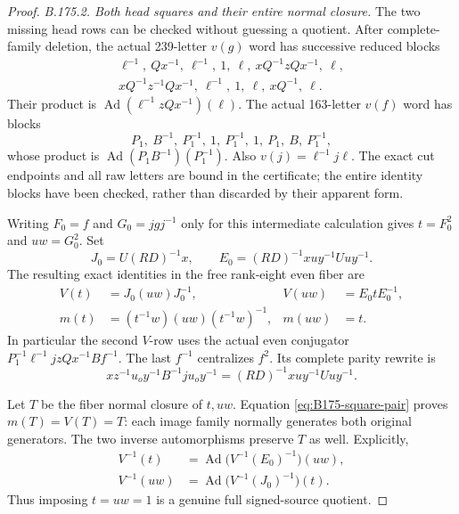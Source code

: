 \begin{proof}
\emph{B.175.2. Both head squares and their entire normal closure.}
The two missing head rows can be checked without guessing a quotient.
After complete-family deletion, the actual 239-letter \(v(g)\) word
has successive reduced blocks
\[
\begin{gathered}
 \ell^{-1},\ Qx^{-1},\ \ell^{-1},\ 1,\ \ell,
 \ xQ^{-1}zQx^{-1},\ \ell,\\
 xQ^{-1}z^{-1}Qx^{-1},\ \ell^{-1},\ 1,\ \ell,
 \ xQ^{-1},\ \ell.
\end{gathered}
\]
Their product is \(\operatorname{Ad}(\ell^{-1}zQx^{-1})(\ell)\).
The actual 163-letter \(v(f)\) word has blocks
\[
 P_1,\ B^{-1},\ P_1^{-1},\ 1,\ P_1^{-1},\ 1,
                    \ P_1,\ B,\ P_1^{-1},
\]
whose product is \(\operatorname{Ad}(P_1B^{-1})(P_1^{-1})\).
Also \(v(j)=\ell^{-1}j\ell\). The exact cut endpoints and all raw
letters are bound in the certificate; the entire identity blocks have
been checked, rather than discarded by their apparent form.

Writing \(F_0=f\) and \(G_0=jgj^{-1}\) only for this intermediate
calculation gives \(t=F_0^2\) and \(uw=G_0^2\). Set
\[
 J_0=U(RD)^{-1}x,\qquad
 E_0=(RD)^{-1}xu y^{-1}Uu y^{-1}.
\]
The resulting exact identities in the free rank-eight even fiber are
\begin{equation}\label{eq:B175-square-pair}
\begin{aligned}
 V(t)&=J_0(uw)J_0^{-1},& V(uw)&=E_0tE_0^{-1},\\
 m(t)&=(t^{-1}w)(uw)(t^{-1}w)^{-1},& m(uw)&=t.
\end{aligned}
\end{equation}
In particular the second \(V\)-row uses the actual even conjugator
\(P_1^{-1}\ell^{-1}jzQx^{-1}Bf^{-1}\). The last \(f^{-1}\)
centralizes \(f^2\). Its complete parity rewrite is
\[
 xz^{-1}u_oy^{-1}B^{-1}ju_oy^{-1}
                         =(RD)^{-1}xu y^{-1}Uu y^{-1}.
\]

Let \(T\) be the fiber normal closure of \(t,uw\).
Equation \eqref{eq:B175-square-pair} proves \(m(T)=V(T)=T\):
each image family normally generates both original generators.
The two inverse automorphisms preserve \(T\) as well. Explicitly,
\[
\begin{aligned}
 V^{-1}(t)&=\operatorname{Ad}\bigl(V^{-1}(E_0)^{-1}\bigr)(uw),\\
 V^{-1}(uw)&=\operatorname{Ad}\bigl(V^{-1}(J_0)^{-1}\bigr)(t).
\end{aligned}
\]
Thus imposing \(t=uw=1\) is a genuine full signed-source quotient.


\end{proof}
